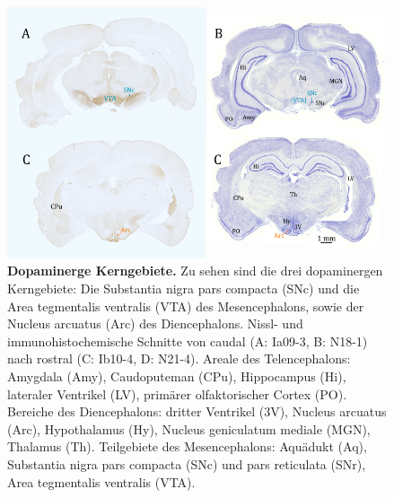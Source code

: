 \documentclass[12pt,a4paper,pdftex]{article}
\begin{document}
\begin{figure}[H]
    \centering
    \includegraphics[width=\textwidth]{pictures/Bilder_monoamine_systeme/dopaminerge_kerne.png}
    \caption[Dopaminerge Kerngebiete]{\textbf{Dopaminerge Kerngebiete.} Zu sehen sind die drei dopaminergen Kerngebiete: Die Substantia nigra pars compacta (SNc) und die Area tegmentalis ventralis (VTA) des Mesencephalons, sowie der Nucleus arcuatus (Arc) des Diencephalons. Nissl- und immunohistochemische Schnitte von caudal (A: Ia09-3, B: N18-1) nach rostral (C: Ib10-4, D: N21-4). Areale des Telencephalons: Amygdala (Amy), Caudoputeman (CPu), Hippocampus (Hi), lateraler Ventrikel (LV), primärer olfaktorischer Cortex (PO). Bereiche des Diencephalons: dritter Ventrikel (3V), Nucleus arcuatus (Arc), Hypothalamus (Hy), Nucleus geniculatum mediale (MGN), Thalamus (Th). Teilgebiete des Mesencephalons: Aquädukt (Aq), Substantia nigra pars compacta (SNc) und pars reticulata (SNr), Area tegmentalis ventralis (VTA).}
    \label{fig:dopaminerge_kerngebiete}
\end{figure}
\end{document}
